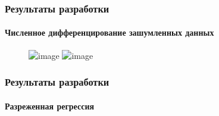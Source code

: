 \documentclass[pdf, hyperref={unicode}, aspectratio=169]{beamer}
\begin{document}
\begin{frame}
\frametitle{Результаты разработки}
\framesubtitle{Численное дифференцирование зашумленных данных}

\begin{figure}
\includegraphics<1>[width=\textwidth]{img/sin_dif_test}
\includegraphics<2>[height=0.75\textheight]{img/lorenz_dif_test}
\end{figure}
\end{frame}


\begin{frame}
\frametitle{Результаты разработки}
\framesubtitle{Разреженная регрессия}

\begin{figure}
\hfill
{}
\end{figure}
\end{frame}
\end{document}
